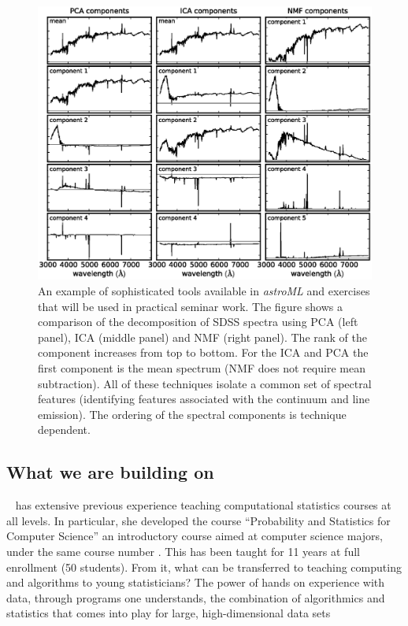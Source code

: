 \begin{figure}[!t]
\vskip -1.8in
\includegraphics[width=1.02\hsize,clip]{astroML2.eps}
\vskip -2.0in
\caption{An example of sophisticated tools available in {\it astroML} and exercises that will be
used in practical seminar work. The figure shows a comparison of the decomposition of SDSS 
spectra using PCA (left panel), ICA (middle panel) and NMF (right panel). The rank of the component
increases from top to bottom. For the ICA and PCA the first component is the mean spectrum (NMF 
does not require mean subtraction). All of these techniques isolate a common set of spectral features 
(identifying features associated with the continuum and line emission). The ordering of the spectral 
components is technique dependent.} 
\label{Fig:astroML2}
\end{figure}

\subsection{What we are building on}
\label{sec:precursors}

\meila~ has extensive previous experience teaching computational
statistics courses at all levels. In particular, she developed the
course ``Probability and Statistics for Computer Science'' an
introductory course aimed at computer science majors, under the same
course number \statcl. This has been taught for 11 years at full
enrollment (50 students). From it, what can be transferred to teaching
computing and algorithms to young statisticians? The power of hands on
experience with data, through programs one understands, the
combination of algorithmics and statistics that comes into play for
large, high-dimensional data sets 

